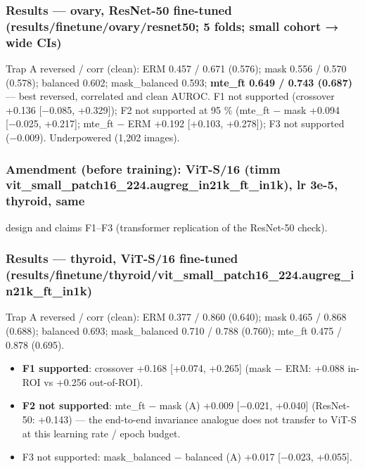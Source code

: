 {\subsubsection{Results --- ovary, ResNet-50 fine-tuned (results/finetune/ovary/resnet50; 5 folds; small cohort → wide CIs)}\label{results--ovary-resnet-50-fine-tuned-resultsfinetuneovaryresnet50-5-folds-small-cohort--wide-cis}

Trap A reversed / corr (clean): ERM 0.457 / 0.671 (0.576); mask 0.556 / 0.570 (0.578); balanced 0.602;
mask\_balanced 0.593; \textbf{mte\_ft 0.649 / 0.743 (0.687)} --- best reversed, correlated and clean AUROC.
F1 not supported (crossover +0.136 {[}−0.085, +0.329{]}); F2 not supported at 95 \% (mte\_ft − mask +0.094
{[}−0.025, +0.217{]}; mte\_ft − ERM +0.192 {[}+0.103, +0.278{]}); F3 not supported (−0.009). Underpowered (1,202 images).

\subsubsection{Amendment (before training): ViT-S/16 (timm vit\_small\_patch16\_224.augreg\_in21k\_ft\_in1k), lr 3e-5, thyroid, same}\label{amendment-before-training-vit-s16-timm-vit_small_patch16_224augreg_in21k_ft_in1k-lr-3e-5-thyroid-same}

design and claims F1--F3 (transformer replication of the ResNet-50 check).

\subsubsection{Results --- thyroid, ViT-S/16 fine-tuned (results/finetune/thyroid/vit\_small\_patch16\_224.augreg\_in21k\_ft\_in1k)}\label{results--thyroid-vit-s16-fine-tuned-resultsfinetunethyroidvit_small_patch16_224augreg_in21k_ft_in1k}

Trap A reversed / corr (clean): ERM 0.377 / 0.860 (0.640); mask 0.465 / 0.868 (0.688); balanced 0.693;
mask\_balanced 0.710 / 0.788 (0.760); mte\_ft 0.475 / 0.878 (0.695).

\begin{itemize}

\item
  \textbf{F1 supported}: crossover +0.168 {[}+0.074, +0.265{]} (mask − ERM: +0.088 in-ROI vs +0.256 out-of-ROI).
\item
  \textbf{F2 not supported}: mte\_ft − mask (A) +0.009 {[}−0.021, +0.040{]} (ResNet-50: +0.143) --- the end-to-end invariance
  analogue does not transfer to ViT-S at this learning rate / epoch budget.
\item
  F3 not supported: mask\_balanced − balanced (A) +0.017 {[}−0.023, +0.055{]}.
\end{itemize}

}

